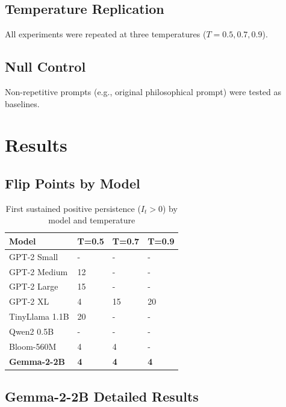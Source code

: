 \documentclass[12pt,a4paper]{article}
\begin{document}
\subsection{Temperature Replication}
All experiments were repeated at three temperatures ($T = 0.5, 0.7, 0.9$).

\subsection{Null Control}
Non-repetitive prompts (e.g., original philosophical prompt) were tested as baselines.

\section{Results}

\subsection{Flip Points by Model}

\begin{table}[H]
\centering
\caption{First sustained positive persistence ($I_t > 0$) by model and temperature}
\begin{tabular}{llll}
\toprule
\textbf{Model} & \textbf{T=0.5} & \textbf{T=0.7} & \textbf{T=0.9} \\
\midrule
GPT-2 Small & - & - & - \\
GPT-2 Medium & 12 & - & - \\
GPT-2 Large & 15 & - & - \\
GPT-2 XL & 4 & 15 & 20 \\
TinyLlama 1.1B & 20 & - & - \\
Qwen2 0.5B & - & - & - \\
Bloom-560M & 4 & 4 & - \\
\textbf{Gemma-2-2B} & \textbf{4} & \textbf{4} & \textbf{4} \\
\bottomrule
\end{tabular}
\end{table}

\subsection{Gemma-2-2B Detailed Results}
\end{document}
